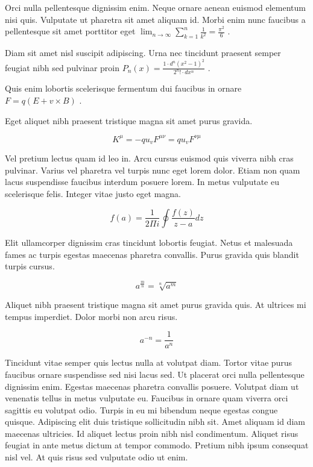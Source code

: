\documentclass{article}
\begin{document}
	
    Orci nulla pellentesque dignissim enim. Neque ornare aenean euismod elementum nisi quis. Vulputate ut pharetra sit amet aliquam id. Morbi enim nunc faucibus a pellentesque sit amet porttitor eget 
    \begin{math}
    	\lim_{n \to \infty}\sum_{k=1}^n \frac{1}{k^2}= \frac{\pi^2}{6}
    \end{math}
    .
    \newline
    
   Diam sit amet nisl suscipit adipiscing. Urna nec tincidunt praesent semper feugiat nibh sed pulvinar proin 
   $ P_n\left ( x \right ) = \frac{1 \cdot d^n\left ( x^2-1 \right )^2}{2^n ! \cdot dx^n} $
   .
   \newline
    
    Quis enim lobortis scelerisque fermentum dui faucibus in ornare 
    \( F=q\left ( E+v \times B \right ) \)
    .
    \newline
    
    Eget aliquet nibh praesent tristique magna sit amet purus gravida.
    
    \[ K^\mu =-qu_vF^{\mu \nu }=qu_vF^{\nu \mu }  \]
    
    Vel pretium lectus quam id leo in. Arcu cursus euismod quis viverra nibh cras pulvinar. Varius vel pharetra vel turpis nunc eget lorem dolor. Etiam non quam lacus suspendisse faucibus interdum posuere lorem. In metus vulputate eu scelerisque felis. Integer vitae justo eget magna.
    
    $$ f\left ( a \right ) = \frac{1}{2\Pi i} \oint \frac{f\left ( z \right )}{z-a} dz $$
    
    Elit ullamcorper dignissim cras tincidunt lobortis feugiat. Netus et malesuada fames ac turpis egestas maecenas pharetra convallis. Purus gravida quis blandit turpis cursus. 
    
    \begin{displaymath}
    	a^{\frac{m}{n}}=\sqrt[n]{a^{m}}
    \end{displaymath}
    
    Aliquet nibh praesent tristique magna sit amet purus gravida quis. At ultrices mi tempus imperdiet. Dolor morbi non arcu risus.
    
    \begin{equation}
    	a^{-n}=\frac{1}{a^{n}}
    \end{equation}
    
    Tincidunt vitae semper quis lectus nulla at volutpat diam. Tortor vitae purus faucibus ornare suspendisse sed nisi lacus sed. Ut placerat orci nulla pellentesque dignissim enim. Egestas maecenas pharetra convallis posuere. Volutpat diam ut venenatis tellus in metus vulputate eu. Faucibus in ornare quam viverra orci sagittis eu volutpat odio. Turpis in eu mi bibendum neque egestas congue quisque. Adipiscing elit duis tristique sollicitudin nibh sit. Amet aliquam id diam maecenas ultricies. Id aliquet lectus proin nibh nisl condimentum. Aliquet risus feugiat in ante metus dictum at tempor commodo. Pretium nibh ipsum consequat nisl vel. At quis risus sed vulputate odio ut enim.
    
\end{document}
